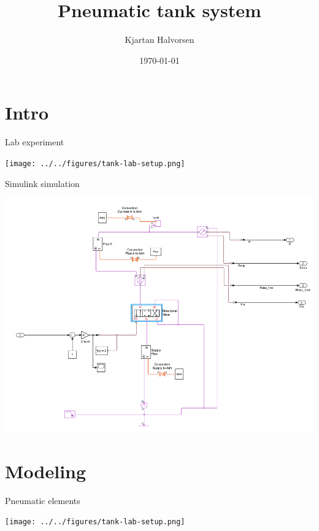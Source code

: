 \documentclass[presentation,aspectratio=1610]{beamer}
\author{Kjartan Halvorsen}
\date{\today}
\title{Pneumatic tank system}
\begin{document}
\maketitle

\section{Intro}
\label{sec:org8bfd10f}
\begin{frame}[label={sec:org5f5b8a7}]{Lab experiment}
\begin{center}
\texttt{[image: ../../figures/tank-lab-setup.png]}
\end{center}
\end{frame}

\begin{frame}[label={sec:orgadadc1a}]{Simulink simulation}
\begin{center}
\includegraphics[width=0.8\linewidth]{../../figures/tank-simscape-model.png}
\end{center}
\end{frame}

\section{Modeling}
\label{sec:orgfdff3e1}
\begin{frame}[label={sec:org8513ecf}]{Pneumatic elements}
\begin{center}
\texttt{[image: ../../figures/tank-lab-setup.png]}
\end{center}
\end{frame}
\end{document}
